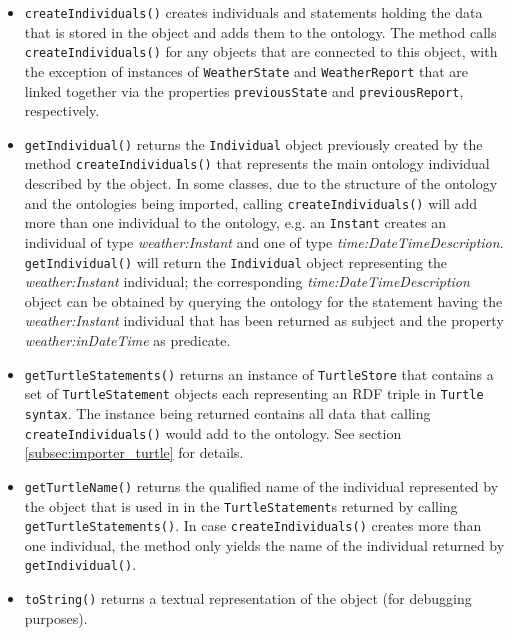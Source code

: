 \begin{itemize}
  \item \texttt{createIndividuals()} creates individuals and statements holding the data that is stored in the object and adds them to the ontology. The method calls \texttt{createIndividuals()} for any objects that are connected to this object, with the exception of instances of \texttt{WeatherState} and \texttt{WeatherReport} that are linked together via the properties \texttt{previousState} and \texttt{previousReport}, respectively.
  \item \texttt{getIndividual()} returns the \texttt{Individual} object previously created by the method \texttt{createIndividuals()} that represents the main ontology individual described by the object. In some classes, due to the structure of the \thinkhomeweather ontology and the ontologies being imported, calling \texttt{createIndividuals()} will add more than one individual to the ontology, e.g. an \texttt{Instant} creates an individual of type \emph{weather:Instant} and one of type \emph{time:DateTimeDescription}. \texttt{getIndividual()} will return the \texttt{Individual} object representing the \emph{weather:Instant} individual; the corresponding \emph{time:DateTimeDescription} object can be obtained by querying the ontology for the statement having the \emph{weather:Instant} individual that has been returned as subject and the property \emph{weather:inDateTime} as predicate.
  \item \texttt{getTurtleStatements()} returns an instance of \texttt{TurtleStore} that contains a set of \texttt{TurtleStatement} objects each representing an RDF triple in \texttt{Turtle syntax}. The instance being returned contains all data that calling \texttt{createIndividuals()} would add to the ontology. See section \ref{subsec:importer_turtle} for details.
  \item \texttt{getTurtleName()} returns the qualified name of the individual represented by the object that is used in in the \texttt{TurtleStatement}s returned by calling \texttt{getTurtleStatements()}. In case \texttt{createIndividuals()} creates more than one individual, the method only yields the name of the individual returned by \texttt{getIndividual()}.
  \item \texttt{toString()} returns a textual representation of the object (for debugging purposes).
\end{itemize}

